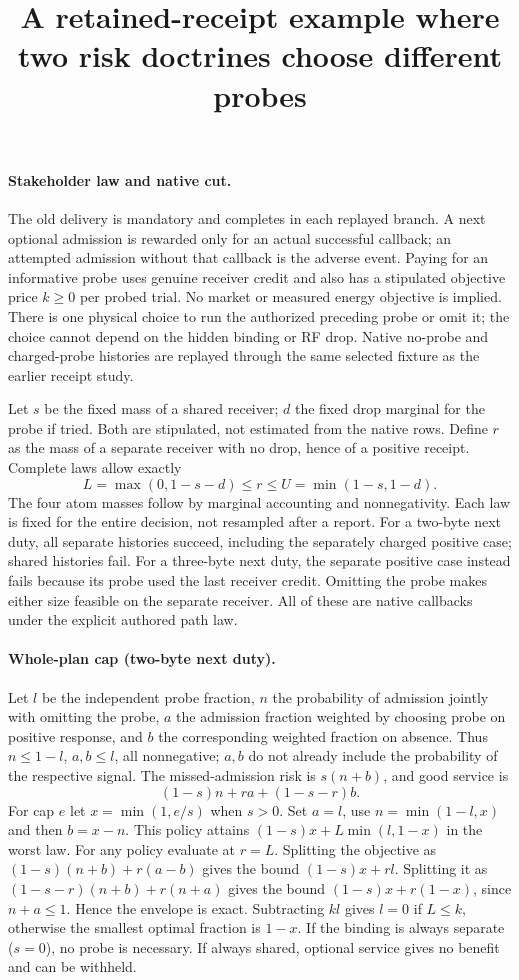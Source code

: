 \documentclass{article}
\title{A retained-receipt example where two risk doctrines choose different probes}
\author{}\date{}
\begin{document}
\maketitle
\paragraph{Stakeholder law and native cut.}
The old delivery is mandatory and completes in each replayed
branch. A next optional admission is rewarded only for an actual
successful callback; an attempted admission without that callback
is the adverse event. Paying for an informative probe uses genuine
receiver credit and also has a stipulated objective price $k\ge0$
per probed trial. No market or measured energy objective is implied.
There is one physical choice to run the authorized preceding probe
or omit it; the choice cannot depend on the hidden binding or RF
drop. Native no-probe and charged-probe histories are replayed
through the same selected fixture as the earlier receipt study.

Let $s$ be the fixed mass of a shared receiver; $d$ the fixed drop
marginal for the probe if tried. Both are stipulated, not estimated
from the native rows. Define $r$ as the mass of a separate receiver
with no drop, hence of a positive receipt. Complete laws allow exactly
\[
             L=\max(0,1-s-d)\le r\le U=\min(1-s,1-d).
\]
The four atom masses follow by marginal accounting and nonnegativity.
Each law is fixed for the entire decision, not resampled after a report.
For a two-byte next duty, all separate histories succeed, including
the separately charged positive case; shared histories fail.
For a three-byte next duty, the separate positive case instead
fails because its probe used the last receiver credit. Omitting
the probe makes either size feasible on the separate receiver.
All of these are native callbacks under the explicit authored path law.

\paragraph{Whole-plan cap (two-byte next duty).}
Let $l$ be the independent probe fraction, $n$ the probability
of admission jointly with omitting the probe, $a$ the admission
fraction weighted by choosing probe on positive response, and $b$
the corresponding weighted fraction on absence. Thus
$n\le1-l$, $a,b\le l$, all nonnegative; $a,b$ do not already include
the probability of the respective signal.
The missed-admission risk is $s(n+b)$, and good service is
\[
        (1-s)n+r a+(1-s-r)b .
\]
For cap $e$ let $x=\min(1,e/s)$ when $s>0$. Set $a=l$,
use $n=\min(1-l,x)$ and then $b=x-n$. This policy attains
$(1-s)x+L\min(l,1-x)$ in the worst law.
For any policy evaluate at $r=L$. Splitting the objective as
$(1-s)(n+b)+r(a-b)$ gives the bound $(1-s)x+r l$.
Splitting it as $(1-s-r)(n+b)+r(n+a)$ gives the bound
$(1-s)x+r(1-x)$, since $n+a\le1$. Hence the envelope is exact.
Subtracting $k l$ gives $l=0$ if $L\le k$, otherwise the smallest
optimal fraction is $1-x$. If the binding is always separate
($s=0$), no probe is necessary. If always shared, optional
service gives no benefit and can be withheld.
\end{document}

